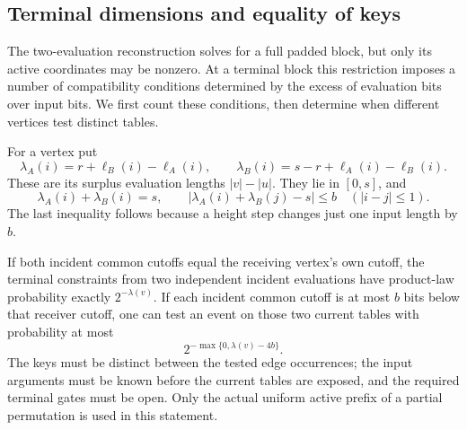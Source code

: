 \subsection{Terminal dimensions and equality of keys}

The two-evaluation reconstruction solves for a full padded block, but
only its active coordinates may be nonzero.  At a terminal block this
restriction imposes a number of compatibility conditions determined by
the excess of evaluation bits over input bits.  We first count these
conditions, then determine when different vertices test distinct tables.

For a vertex put
\[
 \lambda_A(i)=r+\ell_B(i)-\ell_A(i),\qquad
 \lambda_B(i)=s-r+\ell_A(i)-\ell_B(i).
\]
These are its surplus evaluation lengths $|v|-|u|$.  They lie in
$[0,s]$, and
\begin{equation}
\label{eq:pruning-surplus-pair}
 \lambda_A(i)+\lambda_B(i)=s,
 \qquad
 |\lambda_A(i)+\lambda_B(j)-s|\leq b
 \quad(|i-j|\leq1).
\end{equation}
The last inequality follows because a height step changes just one
input length by $b$.

\begin{lemma}
\label{lem:pruning-terminal-codimension}
If both incident common cutoffs equal the receiving vertex's own
cutoff, the terminal constraints from two independent incident
evaluations have product-law probability exactly $2^{-\lambda(v)}$.
If each incident common cutoff is at most $b$ bits below that
receiver cutoff, one can test an event on those two current tables
with probability at most
\[
 2^{-\max\{0,\lambda(v)-4b\}}.
\]
The keys must be distinct between the tested edge occurrences;
the input arguments must be known before the current tables are
exposed, and the required terminal gates must be open.
Only the actual uniform active prefix of a partial permutation is
used in this statement.
\end{lemma}

